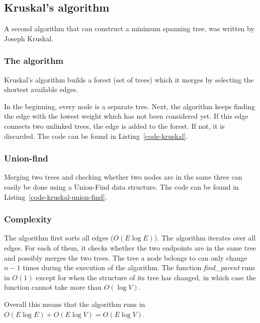 \subsection{Kruskal's algorithm}
A second algorithm that can construct a minimum spanning tree, was written by Joseph Kruskal.
\subsubsection{The algorithm}
Kruskal's algorithm builds a forest (set of trees) which it merges by selecting the shortest available edges.

In the beginning, every node is a separate tree. Next, the algorithm keeps finding the edge with the lowest weight which has not been considered yet. If this edge connects two unlinked trees, the edge is added to the forest. If not, it is discarded.
The code can be found in Listing~\ref{code-kruskal}.

\subsubsection{Union-find}
Merging two trees and checking whether two nodes are in the same three can easily be done using a Union-Find data structure.
The code can be found in Listing~\ref{code-kruskal-union-find}.


\subsubsection{Complexity}
The algorithm first sorts all edges ($O(E\log{E})$).
The algorithm iterates over all edges. For each of them, it checks whether the two endpoints are in the same tree and possibly merges the two trees. The tree a node belongs to can only change $n-1$ times during the execution of the algorithm. The function \textit{find\_parent} runs in $O(1)$ except for when the structure of its tree has changed, in which case the function cannot take more than $O(\log{V})$. 

Overall this means that the algorithm runs in $O(E\log{E}) + O(E \log{V}) = O(E \log{V})$.